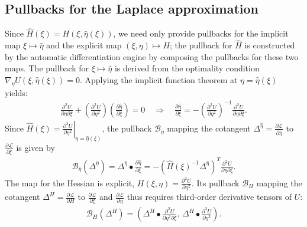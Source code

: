 \documentclass{article}
\begin{document}
\subsection{Pullbacks for the Laplace approximation}

Since $\hat{H}(\xi) = H(\xi, \hat{\eta}(\xi))$, we need only provide pullbacks for the implicit map $\xi \mapsto \hat{\eta}$ and the explicit map $(\xi, \eta) \mapsto H$;
the pullback for $\hat{H}$ is constructed by the automatic differentiation engine by composing the pullbacks for these two maps.
The pullback for $\xi \mapsto \hat{\eta}$ is derived from the optimality condition $\nabla_\eta U(\xi, \hat{\eta}(\xi)) = 0$.
Applying the implicit function theorem at $\eta = \hat{\eta}(\xi)$ yields:
%
\begin{align}
  \frac{\partial^2 U}{\partial \eta \partial \xi} + \left(\frac{\partial^2 U}{\partial \eta^2}\right) \left(\frac{\partial \hat{\eta}}{\partial \xi}\right) = 0
  \quad \Rightarrow \quad
  \frac{\partial \hat{\eta}}{\partial \xi} = -\left(\frac{\partial^2 U}{\partial \eta^2}\right)^{-1} \frac{\partial^2 U}{\partial \eta \partial \xi}.
\end{align}
%
Since $\hat{H}(\xi) = \left. \frac{\partial^2 U}{\partial \eta^2} \right|_{\eta=\hat{\eta}(\xi)}$, the pullback $\mathcal{B}_{\hat{\eta}}$ mapping the cotangent $\Delta^{\hat{\eta}} = \frac{\partial \mathcal{L}}{\partial \hat{\eta}}$ to $\frac{\partial \mathcal{L}}{\partial \xi}$ is given by
%
\begin{align}\label{eq:pullback-eta-hat}
  \mathcal{B}_{\hat{\eta}}(\Delta^{\hat{\eta}})
  = \Delta^{\hat{\eta}} \bullet \frac{\partial \hat{\eta}}{\partial \xi}
  = -\left( \hat{H}(\xi)^{-1} \Delta^{\hat{\eta}} \right)^{T} \frac{\partial^2 U}{\partial \eta \partial \xi}.
\end{align}
%
The map for the Hessian is explicit, $H(\xi, \eta) = \frac{\partial^2 U}{\partial \eta^2}$.
Its pullback $\mathcal{B}_H$ mapping the cotangent $\Delta^H = \frac{\partial \mathcal{L}}{\partial H}$ to $\frac{\partial \mathcal{L}}{\partial \xi}$ and $\frac{\partial \mathcal{L}}{\partial \eta}$ thus requires third-order derivative tensors of $U$:
%
\begin{align}\label{eq:pullback-H}
  \mathcal{B}_H(\Delta^H) = \left( \Delta^H \bullet \frac{\partial^3 U}{\partial \eta^2 \partial \xi}, \, \Delta^H \bullet \frac{\partial^3 U}{\partial \eta^3} \right).
\end{align}
\end{document}
